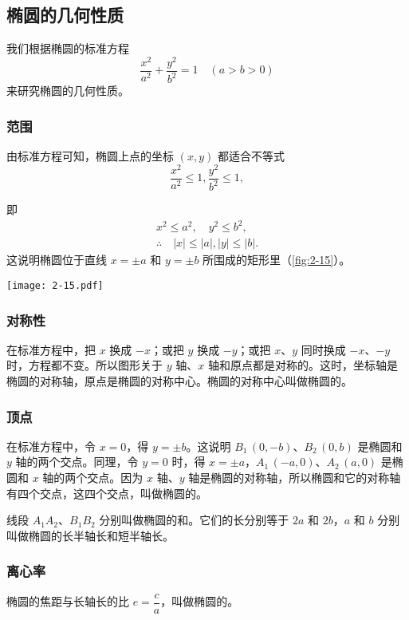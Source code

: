 \subsection{椭圆的几何性质}
我们根据椭圆的标准方程
\[\frac{x^2}{a^2}+\frac{y^2}{b^2}=1 \quad(a>b>0)\]
来研究椭圆的几何性质。
\subsubsection{范围}
由标准方程可知，椭圆上点的坐标 $(x,y)$ 都适合不等式
\[ \frac{x^2}{a^2}\leqslant 1, \frac{y^2}{b^2}\leqslant 1, \]
\begin{minipage}{0.55\linewidth}
即
\begin{gather*} 
  x^2\leqslant a^2,\quad y^2\leqslant b^2,\\
  \therefore\quad |x|\leqslant|a|, |y|\leqslant|b|.
\end{gather*}
这说明椭圆位于直线 $x=\pm a$ 和 $y=\pm b$ 所围成的矩形里（\cref{fig:2-15}）。
\end{minipage}\hfill
\begin{minipage}{0.4\linewidth}\centering
\begin{figurehere}
  \texttt{[image: 2-15.pdf]}
  \caption{}\label{fig:2-15}
\end{figurehere}
\end{minipage}

\subsubsection{对称性}
在标准方程中，把 $x$ 换成 $-x$；或把 $y$ 换成 $-y$；或把 $x$、$y$ 同时换成 $-x$、$-y$ 时，方程都不变。所以图形关于 $y$ 轴、$x$ 轴和原点都是对称的。这时，坐标轴是椭圆的对称轴，原点是椭圆的对称中心。椭圆的对称中心叫做椭圆的。

\subsubsection{顶点}
在标准方程中，令 $x=0$，得 $y=\pm b$。这说明 $B_1\,(0,-b)$、$B_2\,(0,b)$ 是椭圆和 $y$ 轴的两个交点。同理，令 $y=0$ 时，得 $x=\pm a$，$A_1\,(-a,0)$、$A_2\,(a,0)$ 是椭圆和 $x$ 轴的两个交点。因为 $x$ 轴、$y$ 轴是椭圆的对称轴，所以椭圆和它的对称轴有四个交点，这四个交点，叫做椭圆的。

线段 $A_1A_2$、$B_1B_2$ 分别叫做椭圆的和。它们的长分别等于 $2a$ 和 $2b$，$a$ 和 $b$ 分别叫做椭圆的长半轴长和短半轴长。

\subsubsection{离心率}
椭圆的焦距与长轴长的比 $e=\dfrac{c}{a}$，叫做椭圆的。

